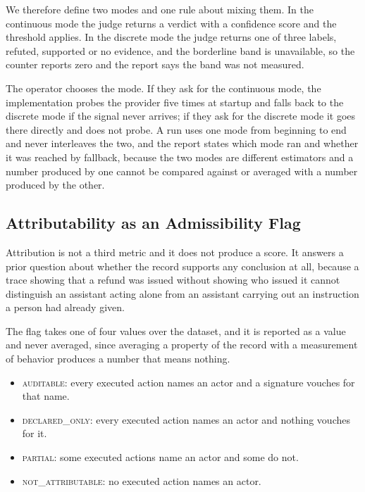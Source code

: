 \documentclass[11pt,a4paper]{article}
\begin{document}
We therefore define two modes and one rule about mixing them. In the continuous
mode the judge returns a verdict with a confidence score and the threshold applies.
In the discrete mode the judge returns one of three labels, refuted, supported or no
evidence, and the borderline band is unavailable, so the counter reports zero and
the report says the band was not measured.

The operator chooses the mode. If they ask for the continuous mode, the
implementation probes the provider five times at startup and falls back to the
discrete mode if the signal never arrives; if they ask for the discrete mode it
goes there directly and does not probe. A run uses one mode from beginning to end
and never interleaves the two, and the report states which mode ran and whether it
was reached by fallback, because the two modes are different estimators and a
number produced by one cannot be compared against or averaged with a number
produced by the other.

\subsection{Attributability as an Admissibility Flag}
\label{sec:attributability}

Attribution is not a third metric and it does not produce a score. It answers a
prior question about whether the record supports any conclusion at all, because
a trace showing that a refund was issued without showing who issued it cannot
distinguish an assistant acting alone from an assistant carrying out an instruction
a person had already given.

The flag takes one of four values over the dataset, and it is reported as a value
and never averaged, since averaging a property of the record with a measurement of
behavior produces a number that means nothing.

\begin{itemize}
  \item \textsc{auditable}: every executed action names an actor and a signature
  vouches for that name.
  \item \textsc{declared\_only}: every executed action names an actor and nothing
  vouches for it.
  \item \textsc{partial}: some executed actions name an actor and some do not.
  \item \textsc{not\_attributable}: no executed action names an actor.
\end{itemize}
\end{document}
